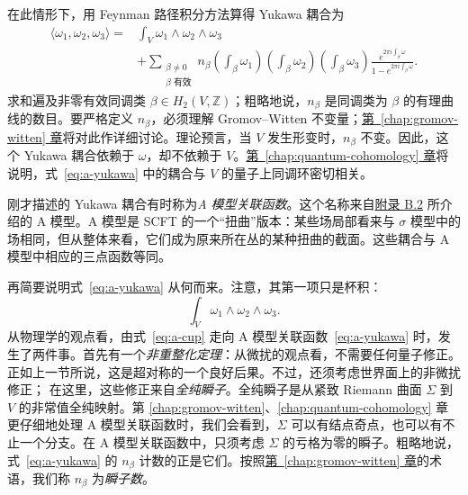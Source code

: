 在此情形下，用 Feynman 路径积分方法算得 Yukawa 耦合为
\begin{equation}\label{eq:a-yukawa}
\begin{aligned}
\langle\omega_1,\omega_2,\omega_3\rangle
={}&\int_V\omega_1\wedge\omega_2\wedge\omega_3\\
&+\sum_{\substack{\beta\ne0\\\beta\text{ 有效}}}n_\beta
 \left(\int_\beta\omega_1\right)
 \left(\int_\beta\omega_2\right)
 \left(\int_\beta\omega_3\right)
 \frac{e^{2\pi i\int_\beta\omega}}{1-e^{2\pi i\int_\beta\omega}}.
\end{aligned}
\end{equation}
求和遍及非零有效同调类 $\beta\in H_2(V,\mathbb Z)$；粗略地说，$n_\beta$ 是同调类为 $\beta$ 的有理曲线的数目。要严格定义 $n_\beta$，必须理解 Gromov--Witten 不变量；\hyperref[chap:gromov-witten]{第~\ref*{chap:gromov-witten} 章}将对此作详细讨论。理论预言，当 $V$ 发生形变时，$n_\beta$ 不变。因此，这个 Yukawa 耦合依赖于 $\omega$，却不依赖于 $V$。\hyperref[chap:quantum-cohomology]{第~\ref*{chap:quantum-cohomology} 章}将说明，式~\eqref{eq:a-yukawa} 中的耦合与 $V$ 的量子上同调环密切相关。

刚才描述的 Yukawa 耦合有时称为\emph{A 模型关联函数}。这个名称来自\hyperref[sec:nonlinear-sigma-models]{附录 B.2} 所介绍的 A 模型。A 模型是 SCFT 的一个“扭曲”版本：某些场局部看来与 $\sigma$ 模型中的场相同，但从整体来看，它们成为原来所在丛的某种扭曲的截面。这些耦合与 A 模型中相应的三点函数等同。

再简要说明式~\eqref{eq:a-yukawa} 从何而来。注意，其第一项只是杯积：
\begin{equation}\label{eq:a-cup}
\int_V\omega_1\wedge\omega_2\wedge\omega_3.
\end{equation}
从物理学的观点看，由式~\eqref{eq:a-cup} 走向 A 模型关联函数~\eqref{eq:a-yukawa} 时，发生了两件事。首先有一个\emph{非重整化定理}：从微扰的观点看，不需要任何量子修正。正如上一节所说，这是超对称的一个良好后果。不过，还须考虑世界面上的非微扰修正；
在这里，这些修正来自\emph{全纯瞬子}。全纯瞬子是从紧致 Riemann 曲面 $\Sigma$ 到 $V$ 的非常值全纯映射。第 \hyperref[chap:gromov-witten]{\ref*{chap:gromov-witten}}、\hyperref[chap:quantum-cohomology]{\ref*{chap:quantum-cohomology}} 章更仔细地处理 A 模型关联函数时，我们会看到，$\Sigma$ 可以有结点奇点，也可以有不止一个分支。在 A 模型关联函数中，只须考虑 $\Sigma$ 的亏格为零的瞬子。粗略地说，式~\eqref{eq:a-yukawa} 的 $n_\beta$ 计数的正是它们。按照\hyperref[chap:gromov-witten]{第~\ref*{chap:gromov-witten} 章}的术语，我们称 $n_\beta$ 为\emph{瞬子数}。

